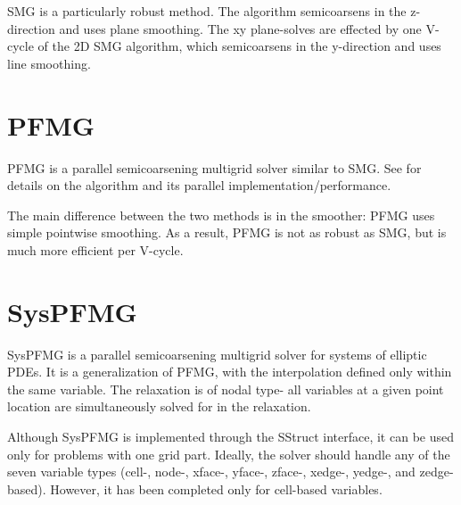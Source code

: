 SMG is a particularly robust method.  The algorithm semicoarsens in
the z-direction and uses plane smoothing.  The xy plane-solves are
effected by one V-cycle of the 2D SMG algorithm, which semicoarsens in
the y-direction and uses line smoothing.


\section{PFMG}

PFMG is a parallel semicoarsening multigrid solver similar to SMG.
See \cite{SFAshby_RDFalgout_1996,RDFalgout_JEJones_2000} for details
on the algorithm and its parallel implementation/performance.

The main difference between the two methods is in the smoother: PFMG
uses simple pointwise smoothing.  As a result, PFMG is not as robust
as SMG, but is much more efficient per V-cycle.

                                                                                                                                                             
\section{SysPFMG}

SysPFMG is a parallel semicoarsening multigrid solver for systems of 
elliptic PDEs. It is a generalization of PFMG, with the interpolation
defined only within the same variable. The relaxation is of nodal type-
all variables at a given point location are simultaneously solved for in the
relaxation.

Although SysPFMG is implemented through the SStruct interface, it can
be used only for problems with one grid part. Ideally, the solver should
handle any of the seven variable types (cell-, node-, xface-, yface-, zface-,
xedge-, yedge-, and zedge-based). However, it has been completed only for cell-based
variables.


                                                                                                                                                             
